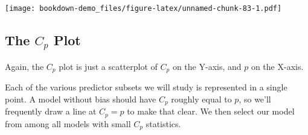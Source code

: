 \documentclass[]{book}
\newenvironment{Shaded}{\begin{snugshade}}{\end{snugshade}}
\newcommand{\KeywordTok}[1]{\textcolor[rgb]{0.13,0.29,0.53}{\textbf{#1}}}
\newcommand{\DataTypeTok}[1]{\textcolor[rgb]{0.13,0.29,0.53}{#1}}
\newcommand{\DecValTok}[1]{\textcolor[rgb]{0.00,0.00,0.81}{#1}}
\newcommand{\FloatTok}[1]{\textcolor[rgb]{0.00,0.00,0.81}{#1}}
\newcommand{\StringTok}[1]{\textcolor[rgb]{0.31,0.60,0.02}{#1}}
\newcommand{\OperatorTok}[1]{\textcolor[rgb]{0.81,0.36,0.00}{\textbf{#1}}}
\newcommand{\NormalTok}[1]{#1}
\theoremstyle{definition}
\theoremstyle{definition}
\theoremstyle{definition}
\theoremstyle{remark}
\begin{document}
\begin{Shaded}
\end{Shaded}

\texttt{[image: bookdown-demo\_files/figure-latex/unnamed-chunk-83-1.pdf]}

\subsection{\texorpdfstring{The \(C_p\)
Plot}{The C\_p Plot}}\label{the-c_p-plot-1}

Again, the \(C_p\) plot is just a scatterplot of \(C_p\) on the Y-axis,
and \(p\) on the X-axis.

Each of the various predictor subsets we will study is represented in a
single point. A model without bias should have \(C_p\) roughly equal to
\(p\), so we'll frequently draw a line at \(C_p = p\) to make that
clear. We then select our model from among all models with small \(C_p\)
statistics.
\end{document}
